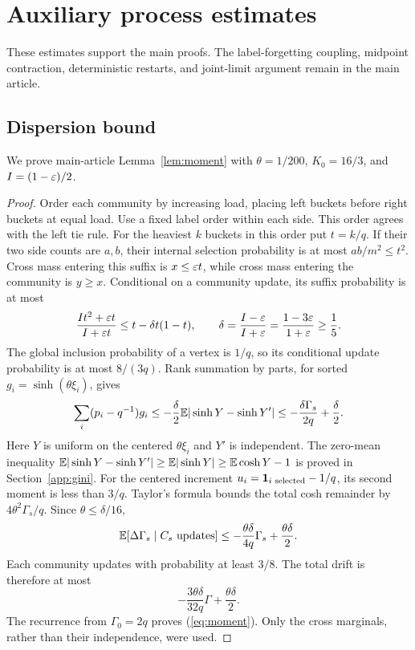 \section{Auxiliary process estimates}\label{app:auxestimates}
These estimates support the main proofs. The label-forgetting coupling,
midpoint contraction, deterministic restarts, and joint-limit argument remain
in the main article.

\subsection{Dispersion bound}\label{app:dispersion}
We prove main-article Lemma~\ref*{lem:moment} with
$\theta=1/200$, $K_0=16/3$, and $I=(1-\varepsilon)/2$.

\begin{proof}
Order each community by increasing load, placing left buckets before right buckets at equal load. Use a fixed label order within each side. This order agrees with the left tie rule. For the heaviest $k$ buckets in this order put $t=k/q$. If their two side counts are $a,b$, their internal selection probability is at most $ab/m^2\le t^2$. Cross mass entering this suffix is $x\le\varepsilon t$, while cross mass entering the community is $y\ge x$. Conditional on a community update, its suffix probability is at most
\[
 \frac{It^2+\varepsilon t}{I+\varepsilon t}
 \le t-\delta t(1-t),\qquad
 \delta=\frac{I-\varepsilon}{I+\varepsilon}=\frac{1-3\varepsilon}{1+\varepsilon}\ge\frac15.
\]
The global inclusion probability of a vertex is $1/q$, so its conditional update probability is at most $8/(3q)$. Rank summation by parts, for sorted $g_i=\sinh(\theta\xi_i)$, gives
\[
 \sum_i(p_i-q^{-1})g_i
 \le-\frac\delta2\mathbb E|\sinh Y-\sinh Y'|
 \le-\frac{\delta\Gamma_s}{2q}+\frac\delta2.
\]
Here $Y$ is uniform on the centered $\theta\xi_i$ and $Y'$ is independent. The zero-mean inequality $\mathbb E|\sinh Y-\sinh Y'|\ge\mathbb E|\sinh Y|\ge\mathbb E\cosh Y-1$ is proved in Section~\ref{app:gini}.
For the centered increment $u_i=\mathbf 1_{i\text{ selected}}-1/q$, its second moment is less than $3/q$. Taylor's formula bounds the total cosh remainder by $4\theta^2\Gamma_s/q$. Since $\theta\le\delta/16$,
\[
 \mathbb E[\Delta\Gamma_s\mid C_s\text{ updates}]
 \le-\frac{\theta\delta}{4q}\Gamma_s+\frac{\theta\delta}2.
\]
Each community updates with probability at least $3/8$. The total drift is therefore at most
\[
 -\frac{3\theta\delta}{32q}\Gamma+\frac{\theta\delta}{2}.
\] The recurrence from $\Gamma_0=2q$ proves (\ref*{eq:moment}). Only the cross marginals, rather than their independence, were used.
\end{proof}

